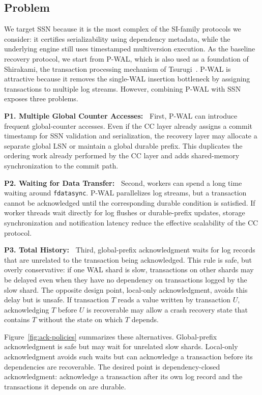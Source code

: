 \subsection{Problem}
\label{sec:introduction-problem}

We target SSN because it is the most complex of the SI-family protocols we
consider: it certifies serializability using dependency metadata, while the
underlying engine still uses timestamped multiversion execution.  As the
baseline recovery protocol, we start from P-WAL, which is also used as a
foundation of Shirakami, the transaction processing mechanism of
Tsurugi~\cite{kamiya2017pwal,kawashima2025tsurugi}. 
%
P-WAL is attractive because
it removes the single-WAL insertion bottleneck by assigning transactions to
multiple log streams.  However, combining P-WAL with SSN exposes three
problems.

\textbf{P1. Multiple Global Counter Accesses:~} First, P-WAL can introduce frequent global-counter accesses.  Even if the CC
layer already assigns a commit timestamp for SSN validation and serialization,
the recovery layer may allocate a separate global LSN or maintain a global
durable prefix.  This duplicates the ordering work already performed by the CC layer
and adds shared-memory synchronization to the commit path.

\textbf{P2. Waiting for Data Transfer:~} Second, workers can spend a long time waiting around \texttt{fdatasync}.  P-WAL
parallelizes log streams, but a transaction cannot be acknowledged until the corresponding durable condition is satisfied.  If worker threads wait directly
for log flushes or durable-prefix updates, storage synchronization and
notification latency reduce the effective scalability of the CC protocol.

\textbf{P3. Total History:~} Third, global-prefix acknowledgment waits for log records that are unrelated to
the transaction being acknowledged.  This rule is safe, but overly conservative:
if one WAL shard is slow, transactions on other shards may be delayed even when
they have no dependency on transactions logged by the slow shard.  The opposite
design point, local-only acknowledgment, avoids this delay but is unsafe.  If
transaction $T$ reads a value written by transaction $U$, acknowledging $T$
before $U$ is recoverable may allow a crash recovery state that contains $T$
without the state on which $T$ depends.

Figure~\ref{fig:ack-policies} summarizes these alternatives.  Global-prefix
acknowledgment is safe but may wait for unrelated slow shards.  Local-only
acknowledgment avoids such waits but can acknowledge a transaction before its
dependencies are recoverable.  The desired point is dependency-closed
acknowledgment: acknowledge a transaction after its own log record and the
transactions it depends on are durable.

